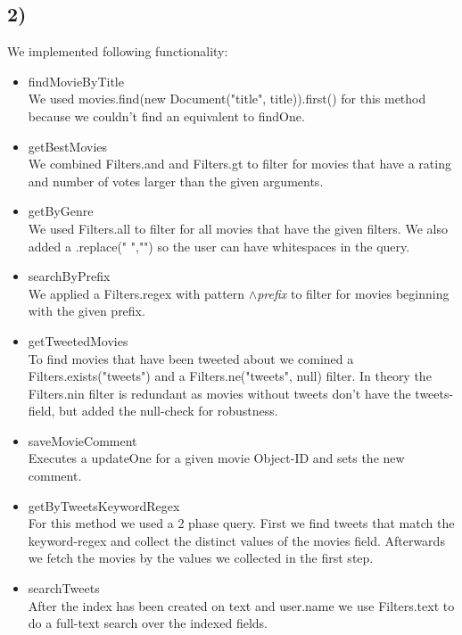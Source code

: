 \documentclass[a4paper,english,abstract=on]{scrartcl}
\begin{document}
\subsection*{2)}
We implemented following functionality:
\begin{itemize}
	\item {\ttconsolas findMovieByTitle}\\
	We used {\ttconsolas movies.find(new Document("title", title)).first()} for this method because we couldn't find an equivalent to {\ttconsolas findOne}.
	\item {\ttconsolas getBestMovies}\\
	We combined {\ttconsolas Filters.and} and {\ttconsolas Filters.gt} to filter for movies that have a rating and number of votes larger than the given arguments.
	\item {\ttconsolas getByGenre}\\
	We used {\ttconsolas Filters.all} to filter for all movies that have the given filters. We also added a {\ttconsolas .replace(" ","")} so the user can have whitespaces in the query.
	\item {\ttconsolas searchByPrefix}\\
	We applied a {\ttconsolas Filters.regex} with pattern {\ttconsolas $\wedge$}\textit{prefix} to filter for movies beginning with the given prefix.
	\item {\ttconsolas getTweetedMovies}\\
	To find movies that have been tweeted about we comined a {\ttconsolas Filters.exists("tweets")} and a {\ttconsolas Filters.ne("tweets", null)} filter. In theory the {\ttconsolas Filters.nin} filter is redundant as movies without tweets don't have the tweets-field, but added the null-check for robustness.
	\item {\ttconsolas saveMovieComment}\\
	Executes a {\ttconsolas updateOne} for a given movie Object-ID and sets the new comment.
	\item {\ttconsolas getByTweetsKeywordRegex}\\
	For this method we used a 2 phase query. First we find tweets that match the keyword-regex and collect the distinct values of the {\ttconsolas movies} field. Afterwards we fetch the movies by the values we collected in the first step.
	\item {\ttconsolas searchTweets}\\
	After the index has been created on {\ttconsolas text} and {\ttconsolas user.name} we use {\ttconsolas Filters.text} to do a full-text search over the indexed fields.

\end{itemize}
\end{document}
